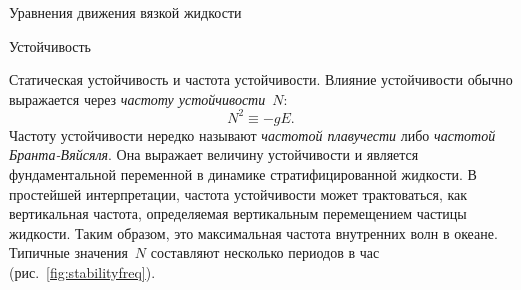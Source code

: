 \begin{chapter}{Уравнения движения вязкой жидкости}
\begin{section}{Устойчивость}
\begin{paragraph}{Статическая устойчивость и частота устойчивости.}
Влияние устойчивости обычно выражается через 
\emph{частоту устойчивости}~$N$:
\begin{equation}\label{eq:8.36}
 N^2 \equiv -g E.
\end{equation}
Частоту устойчивости нередко называют 
\emph{частотой плавучести} 
либо \emph{частотой Бранта-Вяйсяля}. 
Она выражает величину устойчивости и является фундаментальной 
переменной в динамике стратифицированной жидкости. 
В простейшей интерпретации, частота устойчивости может трактоваться, как
вертикальная частота, определяемая вертикальным перемещением
частицы жидкости. Таким образом, это максимальная частота внутренних
волн в океане. Типичные значения~$N$ составляют несколько периодов в час
(рис.~\ref{fig:stabilityfreq}).
%
\end{paragraph}


\end{section}
\end{chapter}
